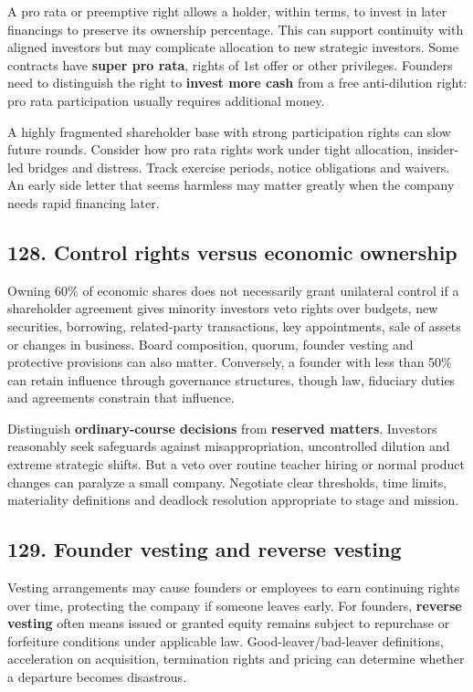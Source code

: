 A pro rata or preemptive right allows a holder, within terms, to invest in later financings to preserve its ownership percentage. This can support continuity with aligned investors but may complicate allocation to new strategic investors. Some contracts have \textbf{super pro rata}, rights of 1st offer or other privileges. Founders need to distinguish the right to \textbf{invest more cash} from a free anti-dilution right: pro rata participation usually requires additional money.

A highly fragmented shareholder base with strong participation rights can slow future rounds. Consider how pro rata rights work under tight allocation, insider-led bridges and distress. Track exercise periods, notice obligations and waivers. An early side letter that seems harmless may matter greatly when the company needs rapid financing later.

\subsection{128. Control rights versus economic ownership}


Owning 60\% of economic shares does not necessarily grant unilateral control if a shareholder agreement gives minority investors veto rights over budgets, new securities, borrowing, related-party transactions, key appointments, sale of assets or changes in business. Board composition, quorum, founder vesting and protective provisions can also matter. Conversely, a founder with less than 50\% can retain influence through governance structures, though law, fiduciary duties and agreements constrain that influence.

Distinguish \textbf{ordinary-course decisions} from \textbf{reserved matters}. Investors reasonably seek safeguards against misappropriation, uncontrolled dilution and extreme strategic shifts. But a veto over routine teacher hiring or normal product changes can paralyze a small company. Negotiate clear thresholds, time limits, materiality definitions and deadlock resolution appropriate to stage and mission.

\subsection{129. Founder vesting and reverse vesting}


Vesting arrangements may cause founders or employees to earn continuing rights over time, protecting the company if someone leaves early. For founders, \textbf{reverse vesting} often means issued or granted equity remains subject to repurchase or forfeiture conditions under applicable law. Good-leaver/bad-leaver definitions, acceleration on acquisition, termination rights and pricing can determine whether a departure becomes disastrous.

